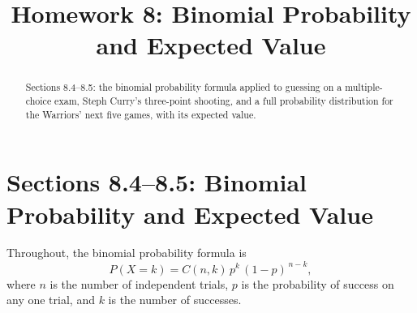 \documentclass[12pt]{ximera}
\title{Homework 8: Binomial Probability and Expected Value}
\begin{document}
\begin{abstract}
Sections 8.4--8.5: the binomial probability formula applied to guessing on a multiple-choice
exam, Steph Curry's three-point shooting, and a full probability distribution for the
Warriors' next five games, with its expected value.
\end{abstract}
\maketitle

\section*{Sections 8.4--8.5: Binomial Probability and Expected Value}

Throughout, the binomial probability formula is
\[
P(X=k) = C(n,k)\, p^k\, (1-p)^{\,n-k},
\]
where $n$ is the number of independent trials, $p$ is the probability of success on
any one trial, and $k$ is the number of successes.
\end{document}
